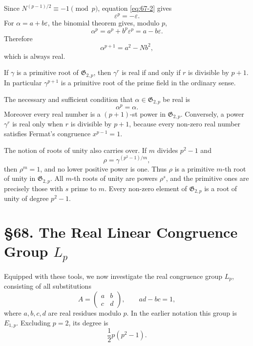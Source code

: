 \documentclass[11pt,a4paper]{book}
\newcommand{\webersection}[2]{\clearpage\section*{\S #1. #2}}
\begin{document}
Since \(N^{(p-1)/2}\equiv-1\pmod p\), equation \eqref{eq:67-2} gives
\begin{equation}\label{eq:67-3}
 \varepsilon^p=-\varepsilon.
\end{equation}
For \(\alpha=a+b\varepsilon\), the binomial theorem gives, modulo \(p\),
\begin{equation}\label{eq:67-4}
 \alpha^p=a^p+b^p\varepsilon^p=a-b\varepsilon.
\end{equation}
Therefore
\begin{equation}\label{eq:67-5}
 \alpha^{p+1}=a^2-Nb^2,
\end{equation}
which is always real.

If \(\gamma\) is a primitive root of \(\mathfrak G_{2,p}\), then \(\gamma^r\) is real if and only if \(r\) is divisible by \(p+1\).  In particular \(\gamma^{p+1}\) is a primitive root of the prime field in the ordinary sense.

The necessary and sufficient condition that \(\alpha\in\mathfrak G_{2,p}\) be real is
\begin{equation}\label{eq:67-real}
 \alpha^p=\alpha.
\end{equation}
Moreover every real number is a \((p+1)\)-st power in \(\mathfrak G_{2,p}\).  Conversely, a power \(\gamma^r\) is real only when \(r\) is divisible by \(p+1\), because every non-zero real number satisfies Fermat's congruence \(x^{p-1}=1\).

The notion of roots of unity also carries over.  If \(m\) divides \(p^2-1\) and
\[
 \rho=\gamma^{(p^2-1)/m},
\]
then \(\rho^m=1\), and no lower positive power is one.  Thus \(\rho\) is a primitive \(m\)-th root of unity in \(\mathfrak G_{2,p}\).  All \(m\)-th roots of unity are powers \(\rho^s\), and the primitive ones are precisely those with \(s\) prime to \(m\).  Every non-zero element of \(\mathfrak G_{2,p}\) is a root of unity of degree \(p^2-1\).

\webersection{68}{The Real Linear Congruence Group \(L_p\)}

Equipped with these tools, we now investigate the real congruence group \(L_p\), consisting of all substitutions
\begin{equation}\label{eq:68-0}
 A=\begin{pmatrix}a&b\\c&d\end{pmatrix},
 \qquad ad-bc=1,
\end{equation}
where \(a,b,c,d\) are real residues modulo \(p\).  In the earlier notation this group is \(E_{1,p}\).  Excluding \(p=2\), its degree is
\begin{equation}\label{eq:68-degree}
 \frac12p(p^2-1).
\end{equation}
\end{document}
